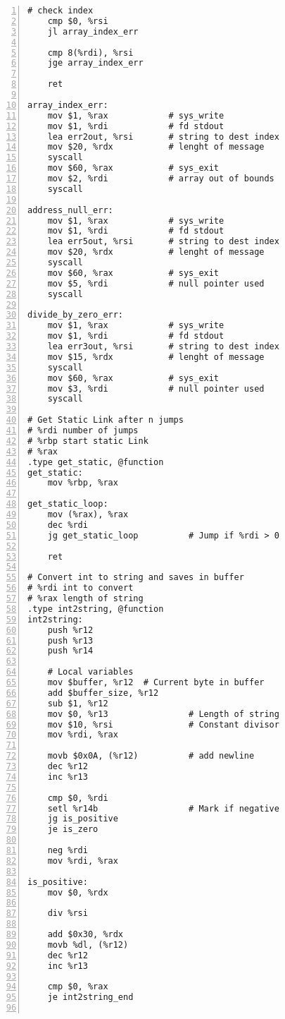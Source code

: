 \documentclass{article}
\begin{document}
\begin{lstlisting}[numbers=left, firstnumber=1]
    # check index
    cmp $0, %rsi
    jl array_index_err
    
    cmp 8(%rdi), %rsi
    jge array_index_err
     
    ret

array_index_err:
    mov $1, %rax 			# sys_write
	mov $1, %rdi			# fd stdout 
	lea err2out, %rsi		# string to dest index
	mov $20, %rdx			# lenght of message 
	syscall 
	mov $60, %rax			# sys_exit
	mov $2, %rdi 			# array out of bounds
	syscall

address_null_err:
    mov $1, %rax 			# sys_write
	mov $1, %rdi			# fd stdout 
	lea err5out, %rsi		# string to dest index
	mov $20, %rdx			# lenght of message 
	syscall 
	mov $60, %rax			# sys_exit
	mov $5, %rdi 			# null pointer used
	syscall
    
divide_by_zero_err:
    mov $1, %rax 			# sys_write
	mov $1, %rdi			# fd stdout 
	lea err3out, %rsi		# string to dest index
	mov $15, %rdx			# lenght of message 
	syscall 
	mov $60, %rax			# sys_exit
	mov $3, %rdi 			# null pointer used
	syscall

# Get Static Link after n jumps
# %rdi number of jumps
# %rbp start static Link
# %rax 
.type get_static, @function
get_static:
    mov %rbp, %rax

get_static_loop:
    mov (%rax), %rax
    dec %rdi
    jg get_static_loop          # Jump if %rdi > 0

    ret

# Convert int to string and saves in buffer
# %rdi int to convert
# %rax length of string
.type int2string, @function
int2string:
    push %r12
    push %r13
    push %r14

    # Local variables
    mov $buffer, %r12  # Current byte in buffer
    add $buffer_size, %r12
    sub $1, %r12
    mov $0, %r13                # Length of string
    mov $10, %rsi               # Constant divisor
    mov %rdi, %rax

    movb $0x0A, (%r12)          # add newline
    dec %r12
    inc %r13

    cmp $0, %rdi
    setl %r14b                  # Mark if negative
    jg is_positive
    je is_zero

    neg %rdi
    mov %rdi, %rax

is_positive:
    mov $0, %rdx

    div %rsi

    add $0x30, %rdx
    movb %dl, (%r12)
    dec %r12
    inc %r13

    cmp $0, %rax
    je int2string_end


\end{lstlisting}
\end{document}
